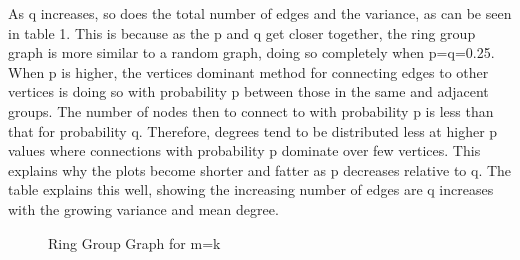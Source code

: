 \documentclass[12pt,a4paper]{article}
\begin{document}
As q increases, so does the total number of edges and the variance, as can be seen in table 1. This is because as the p and q get closer together, the ring group graph is more similar to a random graph, doing so completely when p=q=0.25. When p is higher, the vertices dominant method for connecting edges to other vertices is doing so with probability p between those in the same and adjacent groups. The number of nodes then to connect to with probability p is less than that for probability q. Therefore, degrees tend to be distributed less at higher p values where connections with probability p dominate over few vertices. This explains why the plots become shorter and fatter as p decreases relative to q. The table explains this well, showing the increasing number of edges are q increases with the growing variance and mean degree.

\begin{figure}[]
	\centering
	\qquad
	\caption{Ring Group Graph for m=k}
	\label{both}
\end{figure}
\end{document}

